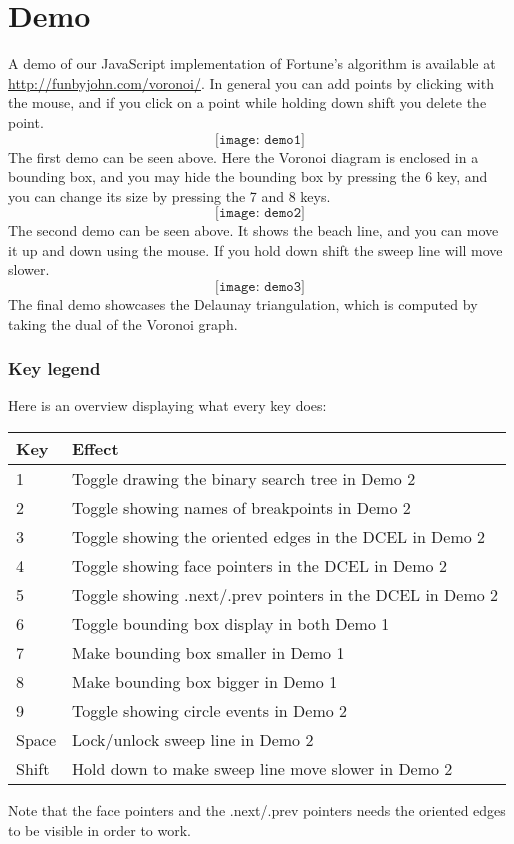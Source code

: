 \chapter{Demo}

A demo of our JavaScript implementation of Fortune's algorithm is available at \url{http://funbyjohn.com/voronoi/}. In general you can add points by clicking with the mouse, and if you click on a point while holding down shift you delete the point.
\[
    \texttt{[image: demo1]}
\]
The first demo can be seen above. Here the Voronoi diagram is enclosed in a bounding box, and you may hide the bounding box by pressing the 6 key, and you can change its size by pressing the 7 and 8 keys.
\[
    \texttt{[image: demo2]}
\]
The second demo can be seen above. It shows the beach line, and you can move it up and down using the mouse. If you hold down shift the sweep line will move slower.
\[
    \texttt{[image: demo3]}
\]
The final demo showcases the Delaunay triangulation, which is computed by taking the dual of the Voronoi graph.

\subsection*{Key legend}
Here is an overview displaying what every key does:
\begin{table}[H]
\centering
\begin{tabular}{ll}
\textbf{Key} & \textbf{Effect}                                           \\ \hline
1            & Toggle drawing the binary search tree in Demo 2           \\
2            & Toggle showing names of breakpoints in Demo 2             \\
3            & Toggle showing the oriented edges in the DCEL in Demo 2   \\
4            & Toggle showing face pointers in the DCEL in Demo 2        \\
5            & Toggle showing .next/.prev pointers in the DCEL in Demo 2 \\
6            & Toggle bounding box display in both Demo 1                \\
7            & Make bounding box smaller in Demo 1                       \\
8            & Make bounding box bigger in Demo 1                        \\
9            & Toggle showing circle events in Demo 2                    \\
Space        & Lock/unlock sweep line in Demo 2                          \\
Shift        & Hold down to make sweep line move slower in Demo 2        \\ \hline
\end{tabular}
\end{table}
Note that the face pointers and the .next/.prev pointers needs the oriented edges to be visible in order to work.

